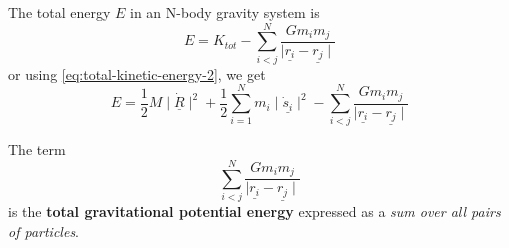 \begin{definition}
  The {total energy $E$ in an N-body gravity} system is
\begin{equation}
  E = K_{tot} - \sum_{i < j}^{N} \frac{Gm_i m_j}{\mid \underline{r_i} - \underline{r_j} \mid} 
  \label{eq: total-energy-n-body-grav}
\end{equation}
  or using \eqref{eq:total-kinetic-energy-2}, we get
  \begin{equation}
    E = \frac{1}{2}M\mid\underline{\dot{R}} \mid^{2} + \frac{1}{2}\sum_{i=1}^{N}m_i \mid \underline{\dot{s}_i}\mid^{2}  - \sum_{i < j}^{N} \frac{Gm_i m_j}{\mid \underline{r_i} - \underline{r_j} \mid}  
    \label{eq:total-energy-n-body-grav-2}
  \end{equation}
\end{definition}

\begin{definition}
  The term
  \begin{equation}
     \sum_{i < j}^{N} \frac{Gm_i m_j}{\mid \underline{r_i} - \underline{r_j} \mid} 
    \label{eq:gravitational-potential-n-body}
  \end{equation}
  is the {\bf total gravitational potential energy} expressed as a {\em sum over all pairs of particles}.
\end{definition}
\clearpage
